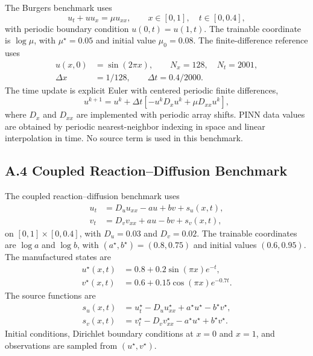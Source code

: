 \documentclass[preprint,12pt]{elsarticle}
\begin{document}
The Burgers benchmark uses
\begin{equation}
    u_t+u u_x=\mu u_{xx},\qquad x\in[0,1],\quad t\in[0,0.4],
\end{equation}
with periodic boundary condition $u(0,t)=u(1,t)$.  The trainable coordinate is $\log\mu$, with $\mu^\star=0.05$ and initial value $\mu_0=0.08$.  The finite-difference reference uses
\begin{equation}
\begin{aligned}
    u(x,0)&=\sin(2\pi x),\qquad N_x=128,\quad N_t=2001,\\
    \Delta x&=1/128,\qquad \Delta t=0.4/2000.
\end{aligned}
\end{equation}
The time update is explicit Euler with centered periodic finite differences,
\begin{equation}
    u^{k+1}=u^k+\Delta t\left[-u^k D_x u^k+\mu D_{xx}u^k\right],
\end{equation}
where $D_x$ and $D_{xx}$ are implemented with periodic array shifts.  PINN data values are obtained by periodic nearest-neighbor indexing in space and linear interpolation in time. No source term is used in this benchmark.

\subsection*{A.4 Coupled Reaction--Diffusion Benchmark}

The coupled reaction--diffusion benchmark uses
\begin{align}
    u_t&=D_u u_{xx}-a u+bv+s_u(x,t),\\
    v_t&=D_v v_{xx}+a u-bv+s_v(x,t),
\end{align}
on $[0,1]\times[0,0.4]$, with $D_u=0.03$ and $D_v=0.02$.  The trainable coordinates are $\log a$ and $\log b$, with $(a^\star,b^\star)=(0.8,0.75)$ and initial values $(0.6,0.95)$.  The manufactured states are
\begin{align}
    u^\star(x,t)&=0.8+0.2\sin(\pi x)e^{-t},\\
    v^\star(x,t)&=0.6+0.15\cos(\pi x)e^{-0.7t}.
\end{align}
The source functions are
\begin{align}
    s_u(x,t)&=u_t^\star-D_u u_{xx}^\star+a^\star u^\star-b^\star v^\star,\\
    s_v(x,t)&=v_t^\star-D_v v_{xx}^\star-a^\star u^\star+b^\star v^\star.
\end{align}
Initial conditions, Dirichlet boundary conditions at $x=0$ and $x=1$, and observations are sampled from $(u^\star,v^\star)$.
\end{document}
